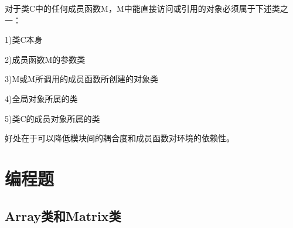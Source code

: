 \documentclass[UTF8]{ctexart}
\begin{document}
    对于类C中的任何成员函数M，M中能直接访问或引用的对象必须属于下述类之一：

    1)类C本身
    
    2)成员函数M的参数类

    3)M或M所调用的成员函数所创建的对象类

    4)全局对象所属的类
    
    5)类C的成员对象所属的类

    好处在于可以降低模块间的耦合度和成员函数对环境的依赖性。




\section{编程题}
\subsection{Array类和Matrix类}
\end{document}
